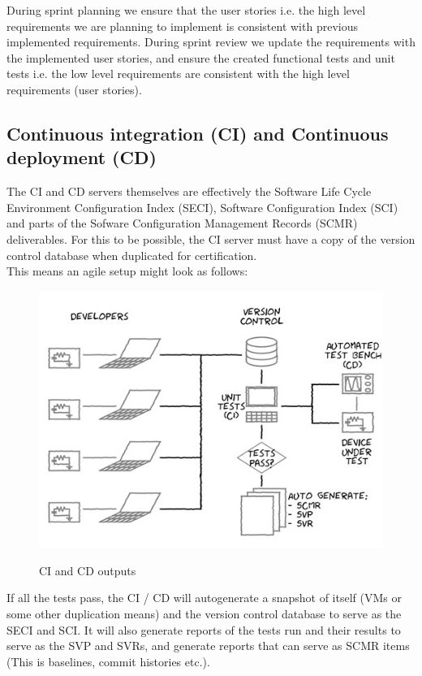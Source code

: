 \documentclass[a4paper]{article}
\begin{document}
During sprint planning we ensure that the user stories i.e. the high level requirements we are planning to implement is consistent with previous implemented requirements. During sprint review we update the requirements with the implemented user stories, and ensure the created functional tests and unit tests i.e. the low level requirements are consistent with the high level requirements (user stories).


\subsection{Continuous integration (CI) and Continuous deployment (CD)}

The CI and CD servers themselves are effectively the Software Life Cycle Environment Configuration Index (SECI), Software Configuration Index (SCI) and parts of the Sofware Configuration Management Records (SCMR) deliverables. For this to be possible, the CI server must have a copy of the version control database when duplicated for certification. \\
This means an agile setup might look as follows:

\begin{center}
\begin{figure}[H]
\centering
\includegraphics[width=0.7\linewidth]{./pictures/CI-CD.jpg}\\
\caption{\label{fig:CI/CD Output}CI and CD outputs}
\end{figure}
\end{center}

If all the tests pass, the CI / CD will autogenerate a snapshot of itself (VMs or some other duplication means) and the version control database to serve as the SECI and SCI. It will also generate reports of the tests run and their results to serve as the SVP and SVRs, and generate reports that can serve as SCMR items (This is baselines, commit histories etc.).
\end{document}
